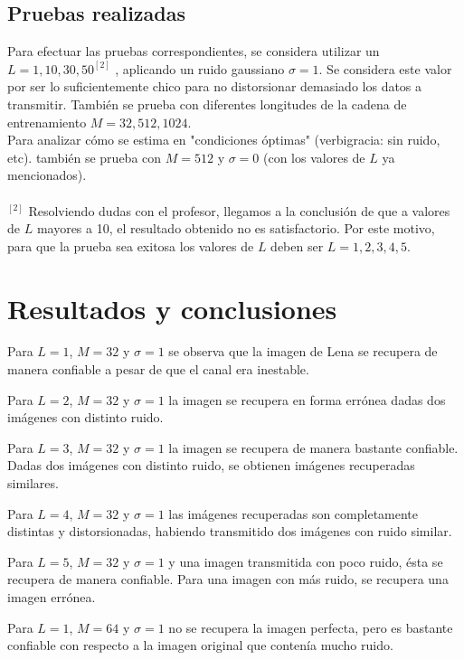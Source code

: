 \documentclass[10pt,journal,compsoc]{IEEEtran}
\begin{document}
\subsection{Pruebas realizadas}
Para efectuar las pruebas correspondientes, se considera utilizar un $L={1,10,30,50}^{[2]}$ , aplicando un ruido gaussiano $\sigma=1$. Se considera este valor por ser lo suficientemente chico para no distorsionar demasiado los datos a transmitir. Tambi\'en se prueba con diferentes longitudes de la cadena de entrenamiento $M={32,512,1024}$. \\  Para analizar c\'omo se estima en "condiciones \'optimas" (verbigracia: sin ruido, etc). tambi\'en se prueba con $M=512$ y $\sigma=0$ (con los valores de $L$ ya mencionados).\\
\\
$^{[2]}$ Resolviendo dudas con el profesor, llegamos a la conclusi\'on de que a valores de $L$ mayores a 10, el resultado obtenido no es satisfactorio. Por este motivo, para que la prueba sea exitosa los valores de $L$ deben ser $L={1, 2, 3, 4, 5}$.

\section{Resultados y conclusiones}

Para $L = {1}$, $M = {32}$ y $\sigma = 1$ se observa que la imagen de Lena se recupera de manera confiable a pesar de que el canal era inestable.


Para $L = {2}$, $M = {32}$ y $\sigma = 1$ la imagen se recupera en forma err\'onea dadas dos im\'agenes con distinto ruido.

Para $L = {3}$, $M = {32}$ y $\sigma = 1$ la imagen se recupera de manera bastante confiable. Dadas dos im\'agenes con distinto ruido, se obtienen im\'agenes recuperadas similares.

Para $L = {4}$, $M = {32}$ y $\sigma = 1$ las im\'agenes recuperadas son completamente distintas y distorsionadas, habiendo transmitido dos im\'agenes con ruido similar.

Para $L = {5}$, $M = {32}$ y $\sigma = 1$ y una imagen transmitida con poco ruido, \'esta se recupera de manera confiable. Para una imagen con m\'as ruido, se recupera una imagen err\'onea.

Para $L = {1}$, $M = {64}$ y $\sigma = 1$ no se recupera la imagen perfecta, pero es bastante confiable con respecto a la imagen original que conten\'ia mucho ruido.
\end{document}
